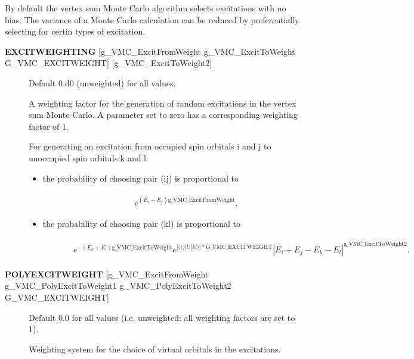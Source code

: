 \documentclass[openany,a4paper,10pt]{manual}
\newcommand{\bra}{\ensuremath{\langle}}
\newcommand{\ket}{\ensuremath{\rangle}}
\begin{document}
By default the vertex sum Monte Carlo algorithm selects excitations
with no bias.  The variance of a Monte Carlo calculation can be reduced
by preferentially selecting for certin types of excitation.
\begin{description}
\item[\textbf{EXCITWEIGHTING} {[}g\_VMC\_ExcitFromWeight g\_VMC\_ExcitToWeight G\_VMC\_EXCITWEIGHT{]} {[}g\_VMC\_ExcitToWeight2{]}]
Default 0.d0 (unweighted) for all values.

A weighting factor for the generation of random excitations in the
vertex sum Monte Carlo.  A parameter set to zero has a corresponding
weighting factor of 1.

For generating an excitation from occupied spin orbitals i and j to
unoccupied spin orbitals k and l:
\begin{itemize}
\item {} \begin{description}
\item[the probability of choosing pair (ij) is proportional to]\begin{align}\begin{split}e^{(E_i+E_j) \text{g\_VMC\_ExcitFromWeight} }.\end{split}\end{align}
\end{description}

\item {} \begin{description}
\item[the probability of choosing pair (kl) is proportional to]\begin{align}\begin{split}e^{-(E_k+E_l) \text{g\_VMC\_ExcitToWeight}} e^{|\bra ij|U|kl\ket|*\text{G\_VMC\_EXCITWEIGHT}} |E_i+E_j-E_k-E_l|^{\text{g\_VMC\_ExcitToWeight2}}.\end{split}\end{align}
\end{description}

\end{itemize}

\item[\textbf{POLYEXCITWEIGHT} {[}g\_VMC\_ExcitFromWeight g\_VMC\_PolyExcitToWeight1 g\_VMC\_PolyExcitToWeight2 G\_VMC\_EXCITWEIGHT{]}]
Default 0.0 for all values (i.e. unweighted: all weighting factors
are set to 1).

Weighting system for the choice of virtual orbitals in
the excitations.


\end{description}
\end{document}
